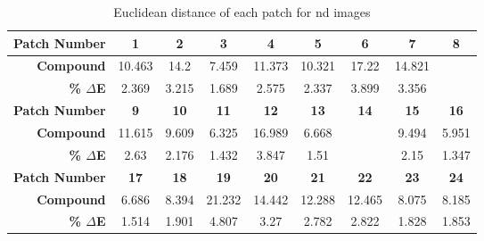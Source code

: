 \begin{table}[H]
  \caption{Euclidean distance of each patch for nd images }
  \begin{center}
    \begin{tabularx}{\textwidth}{r c c c c c c c c}
    \toprule
        \textbf{Patch Number} & \textbf{1} & \textbf{2} & \textbf{3} & \textbf{4} & \textbf{5} & \textbf{6} & \textbf{7} & \textbf{8}\\ \midrule 
        \textbf{Compound} &10.463 &14.2 &7.459 &11.373 &10.321 &17.22 &14.821 &\cellcolor{colorred}{21.988}\\ 
        \textbf{\textbf{\% $\Delta$E}} &2.369 &3.215 &1.689 &2.575 &2.337 &3.899 &3.356 &\cellcolor{colorred}{4.978}\\ \midrule 
        \textbf{Patch Number} & \textbf{9} & \textbf{10} & \textbf{11} & \textbf{12} & \textbf{13} & \textbf{14} & \textbf{15} & \textbf{16}\\ \midrule 
        \textbf{Compound} &11.615 &9.609 &6.325 &16.989 &6.668 &\cellcolor{colorgreen}{5.001} &9.494 &5.951\\ 
        \textbf{\textbf{\% $\Delta$E}} &2.63 &2.176 &1.432 &3.847 &1.51 &\cellcolor{colorgreen}{1.132} &2.15 &1.347\\ \midrule 
        \textbf{Patch Number} & \textbf{17} & \textbf{18} & \textbf{19} & \textbf{20} & \textbf{21} & \textbf{22} & \textbf{23} & \textbf{24}\\ \midrule 
        \textbf{Compound} &6.686 &8.394 &21.232 &14.442 &12.288 &12.465 &8.075 &8.185\\ 
        \textbf{\textbf{\% $\Delta$E}} &1.514 &1.901 &4.807 &3.27 &2.782 &2.822 &1.828 &1.853\\ \midrule 
    \bottomrule
    \end{tabularx}
  \end{center}
\end{table}
